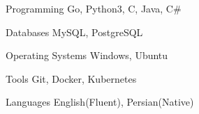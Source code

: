 

\begin{cvskills}

  \cvskill
    {Programming} %
    {Go, Python3, C, Java, C\#} %

  \cvskill
    {Databases} %
    {MySQL, PostgreSQL} %

  \cvskill
    {Operating Systems} %
    {Windows, Ubuntu} %

  \cvskill
    {Tools} %
    {Git, Docker, Kubernetes} %
    
  \cvskill
    {Languages} %
    {English(Fluent), Persian(Native)} %

\end{cvskills}

